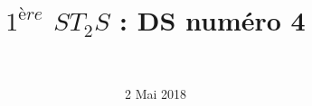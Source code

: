 \documentclass[a4paper,11pt]{exam}
\author{\ }
\date{2 Mai 2018}
\title{$1^{ère}$ $ST_2S$ : DS num\'ero 4}
\begin{document}
%	

	\maketitle







%
%


%
	\label{LastPage}
	
\end{document}
